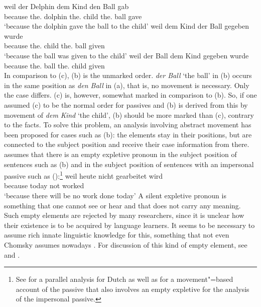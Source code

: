 \eal
\label{ex-passive-German-no-movement}
\ex 
\gll weil der Delphin dem Kind den Ball gab\\
     because the.\NOM{} dolphin the.\DAT{} child the.\ACC{} ball gave\\
\glt `because the dolphin gave the ball to the child'
\ex 
\gll weil    dem        Kind  der        Ball gegeben wurde\\
     because the.\DAT{} child the.\NOM{} ball given \AUX\\
\glt `because the ball was given to the child'
\ex 
\gll weil    der        Ball dem        Kind  gegeben wurde\\
     because the.\NOM{} ball the.\DAT{} child given     \AUX\\
\zl
In comparison to (c), (b) is the unmarked order. \emph{der Ball} `the ball' in (b) occurs
in the same position as \emph{den Ball} in (a), that is, no movement is necessary. Only the case differs.
(c) is, however, somewhat marked in comparison to (b). So, if one assumed (c) to
be the normal order for passives and (b) is derived from this by movement of \emph{dem
  Kind} `the child', (b) should be more marked than (c), contrary to the facts. To
solve this problem, an analysis involving abstract movement has been proposed for
cases such as (b): the elements stay in their positions, but are connected to
the subject position and receive their case information from there. \textcites[155--157]{Grewendorf88a}[]{Grewendorf93}
assumes that there is an empty expletive pronoun
in the subject position of sentences such as (b) and in the subject position of sentences with an
impersonal passive such as ():\footnote{%
	See  for a parallel analysis for Dutch as well as 
	 for a movement"=based account of the passive that also involves an
        empty expletive for the analysis of the impersonal passive.
}
\ea
\gll weil    heute nicht gearbeitet wird\\
     because today not   worked     \AUX\\
\glt `because there will be no work done today'
\z
A silent expletive pronoun is something that one cannot see or hear and that does not carry any
meaning. Such empty elements are rejected by many researchers, since it is unclear how their
existence is to be acquired by language learners. It seems to be necessary to assume rich innate
linguistic knowledge for this, something that not even Chomsky assumes nowadays \citep*{HCF2002a}. For discussion of 
this kind of empty element, see  and .

